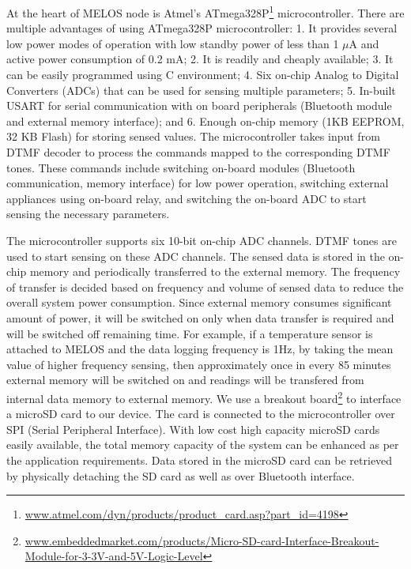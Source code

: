 \documentclass[10pt]{sigplan-proc-varsize}
\newcommand{\melos}{MELOS }
\begin{document}
At the heart of \melos node is Atmel's ATmega328P\footnote{\url{www.atmel.com/dyn/products/product_card.asp?part_id=4198}} microcontroller. There are multiple advantages of using ATmega328P microcontroller: 1. It provides several low power modes of operation with low standby power of less than 1 $\mu$A and active power consumption of 0.2 mA; 2. It is readily and cheaply available; 3. It can be easily programmed using C environment; 4. Six on-chip Analog to Digital Converters (ADCs) that can be used for sensing multiple parameters; 5. In-built USART for serial communication with on board peripherals (Bluetooth module and external memory interface); and 6. Enough on-chip memory (1KB EEPROM, 32 KB Flash) for storing sensed values. The microcontroller takes input from DTMF decoder to process the commands mapped to the corresponding DTMF tones. These commands include switching on-board modules (Bluetooth communication, memory interface) for low power operation, switching external appliances using on-board relay, and switching the on-board ADC to start sensing the necessary parameters. 

The microcontroller supports six 10-bit on-chip ADC channels. DTMF tones are used to start sensing on these ADC channels. The sensed data is stored in the on-chip memory and periodically transferred to the external memory. The frequency of transfer is decided based on frequency and volume of sensed data to reduce the overall system power consumption. Since external memory consumes significant amount of power, it will be switched on only when data transfer is required and will be switched off remaining time. For example, if a temperature sensor is attached to \melos and the data logging frequency is 1Hz, by taking the mean value of higher frequency sensing, then approximately once in every 85 minutes external memory will be switched on and readings will be transfered from internal data memory to external memory.  We use a breakout board\footnote{{\small\url{www.embeddedmarket.com/products/Micro-SD-card-Interface-Breakout-Module-for-3-3V-and-5V-Logic-Level}}} to interface a microSD card to our device. The card is connected to the microcontroller over SPI (Serial Peripheral Interface). With low cost high capacity microSD cards easily available, the total memory capacity of the system can be enhanced as per the application requirements. Data stored in the microSD card can be retrieved by physically detaching the SD card as well as over Bluetooth interface. 
\end{document}
